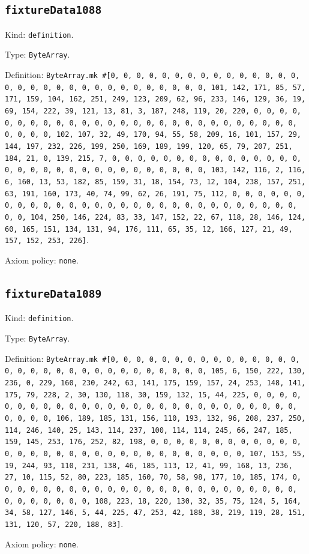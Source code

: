 \documentclass[11pt]{article}
\begin{document}
\subsection*{\texttt{fixtureData1088}}
\noindent Kind: \texttt{definition}.\par
\noindent Type: \texttt{ByteArray}.\par
\noindent Definition: \texttt{ByteArray.mk \#[0, 0, 0, 0, 0, 0, 0, 0, 0, 0, 0, 0, 0, 0, 0, 0, 0, 0, 0, 0, 0, 0, 0, 0, 0, 0, 0, 0, 0, 0, 0, 101, 142, 171, 85, 57, 171, 159, 104, 162, 251, 249, 123, 209, 62, 96, 233, 146, 129, 36, 19, 69, 154, 222, 39, 121, 13, 81, 3, 187, 248, 119, 20, 220, 0, 0, 0, 0, 0, 0, 0, 0, 0, 0, 0, 0, 0, 0, 0, 0, 0, 0, 0, 0, 0, 0, 0, 0, 0, 0, 0, 0, 0, 0, 0, 102, 107, 32, 49, 170, 94, 55, 58, 209, 16, 101, 157, 29, 144, 197, 232, 226, 199, 250, 169, 189, 199, 120, 65, 79, 207, 251, 184, 21, 0, 139, 215, 7, 0, 0, 0, 0, 0, 0, 0, 0, 0, 0, 0, 0, 0, 0, 0, 0, 0, 0, 0, 0, 0, 0, 0, 0, 0, 0, 0, 0, 0, 0, 0, 103, 142, 116, 2, 116, 6, 160, 13, 53, 182, 85, 159, 31, 18, 154, 73, 12, 104, 238, 157, 251, 63, 191, 160, 173, 40, 74, 99, 62, 26, 191, 75, 112, 0, 0, 0, 0, 0, 0, 0, 0, 0, 0, 0, 0, 0, 0, 0, 0, 0, 0, 0, 0, 0, 0, 0, 0, 0, 0, 0, 0, 0, 0, 0, 104, 250, 146, 224, 83, 33, 147, 152, 22, 67, 118, 28, 146, 124, 60, 165, 151, 134, 131, 94, 176, 111, 65, 35, 12, 166, 127, 21, 49, 157, 152, 253, 226]}.\par
\noindent Axiom policy: \texttt{none}.\par
\subsection*{\texttt{fixtureData1089}}
\noindent Kind: \texttt{definition}.\par
\noindent Type: \texttt{ByteArray}.\par
\noindent Definition: \texttt{ByteArray.mk \#[0, 0, 0, 0, 0, 0, 0, 0, 0, 0, 0, 0, 0, 0, 0, 0, 0, 0, 0, 0, 0, 0, 0, 0, 0, 0, 0, 0, 0, 0, 0, 105, 6, 150, 222, 130, 236, 0, 229, 160, 230, 242, 63, 141, 175, 159, 157, 24, 253, 148, 141, 175, 79, 228, 2, 30, 130, 118, 30, 159, 132, 15, 44, 225, 0, 0, 0, 0, 0, 0, 0, 0, 0, 0, 0, 0, 0, 0, 0, 0, 0, 0, 0, 0, 0, 0, 0, 0, 0, 0, 0, 0, 0, 0, 0, 106, 189, 185, 131, 156, 110, 193, 132, 96, 208, 237, 250, 114, 246, 140, 25, 143, 114, 237, 100, 114, 114, 245, 66, 247, 185, 159, 145, 253, 176, 252, 82, 198, 0, 0, 0, 0, 0, 0, 0, 0, 0, 0, 0, 0, 0, 0, 0, 0, 0, 0, 0, 0, 0, 0, 0, 0, 0, 0, 0, 0, 0, 0, 0, 107, 153, 55, 19, 244, 93, 110, 231, 138, 46, 185, 113, 12, 41, 99, 168, 13, 236, 27, 10, 115, 52, 80, 223, 185, 160, 70, 58, 98, 177, 10, 185, 174, 0, 0, 0, 0, 0, 0, 0, 0, 0, 0, 0, 0, 0, 0, 0, 0, 0, 0, 0, 0, 0, 0, 0, 0, 0, 0, 0, 0, 0, 0, 0, 108, 223, 18, 220, 130, 32, 35, 75, 124, 5, 164, 34, 58, 127, 146, 5, 44, 225, 47, 253, 42, 188, 38, 219, 119, 28, 151, 131, 120, 57, 220, 188, 83]}.\par
\noindent Axiom policy: \texttt{none}.\par
\end{document}
